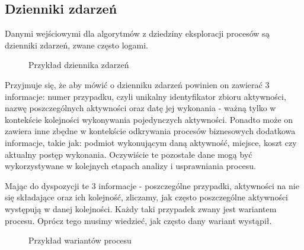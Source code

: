 \subsection{Dzienniki zdarzeń}
\label{sec:event_logs}
Danymi wejściowymi dla algorytmów z dziedziny eksploracji procesów są dzienniki zdarzeń, zwane często logami.
 
\begin{figure}[h]
	\caption{\label{fig:event_log_example}Przykład dziennika zdarzeń}
\end{figure}

Przyjmuje się, że aby mówić o dzienniku zdarzeń powinien on zawierać 3 informacje: numer przypadku, czyli unikalny identyfikator zbioru aktywności, nazwę poszczególnych aktywności oraz datę jej wykonania - ważną tylko w kontekście kolejności wykonywania pojedynczych aktywności. Ponadto może on zawiera inne zbędne w kontekście odkrywania procesów biznesowych dodatkowa informacje, takie jak: podmiot wykonującym daną aktywność, miejsce, koszt czy aktualny postęp wykonania. Oczywiście te pozostałe dane mogą być wykorzystywane w kolejnych etapach analizy i usprawniania procesu.

Mając do dyspozycji te 3 informacje - poszczególne przypadki, aktywności na nie się składające oraz ich kolejność, zliczamy, jak często poszczególne aktywności występują w danej kolejności. Każdy taki przypadek zwany jest wariantem procesu. Oprócz tego musimy wiedzieć, jak często dany wariant wystąpił.

\begin{figure}[h]
	\caption{\label{fig:process_variants_example}Przykład wariantów procesu}
\end{figure}

